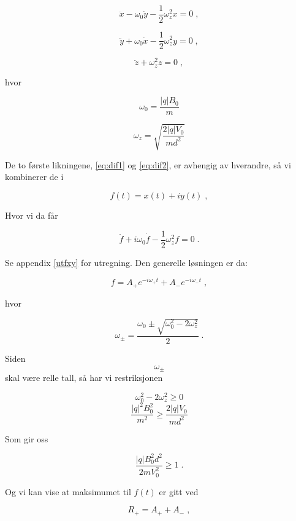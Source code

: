 \documentclass[reprint,english,notitlepage, nofootinbib]{revtex4-1}  %
\begin{document}
\begin{equation} \label{eq:dif1}
\ddot{x} - \omega_0 \dot{y} - \frac{1}{2}\omega_z^2 x = 0 \; ,
\end{equation}

\begin{equation}\label{eq:dif2}
\ddot{y} + \omega_0 \dot{x} - \frac{1}{2}\omega_z^2 y = 0 \; ,
\end{equation}

\begin{equation}\label{eq:dif3}
\ddot{z} + \omega_z^2 z = 0 \; ,
\end{equation}

hvor


$$\omega_0 = \frac{|q|B_0}{m}$$

$$ \omega_z = \sqrt{\frac{2|q|V_0}{md^2}}$$

De to første likningene, \ref{eq:dif1} og \ref{eq:dif2}, er avhengig av hverandre, så vi kombinerer de i

$$
f(t) = x(t) + iy(t) \; ,
$$

Hvor vi da får 

\begin{equation}\label{fxy}
\ddot{f} + i\omega_0 \dot{f} - \frac{1}{2} \omega_z^2 f = 0 \; .
\end{equation}

Se appendix \ref{utfxy} for utregning. Den generelle løsningen er da:

\begin{equation}\label{fsolve}
f = A_+e^{-i\omega_+t} + A_-e^{-i\omega_-t} \; ,
\end{equation}

hvor

$$\omega_{\pm} = \frac{\omega_0 \pm \sqrt{\omega_0^2-2\omega_z^2}}{2} \; .$$

Siden $$\omega_{\pm}$$ skal være relle tall, så har vi restriksjonen

$$\omega_0^2-2\omega_z^2 \geq 0$$
$$\frac{|q|^2B_0^2}{m^2} \geq \frac{2|q|V_0}{md^2}$$

Som gir oss

\begin{equation}
\frac{|q|B_0^2d^2}{2mV_0^2} \geq 1 \; .
\end{equation}

Og vi kan vise at maksimumet til $f(t)$ er gitt ved

\begin{equation}\label{fmaks}
R_+ = A_+ + A_- \; ,
\end{equation}
\end{document}
